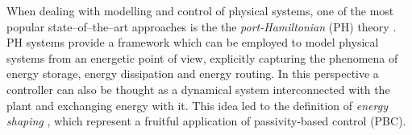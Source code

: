 {When dealing with modelling and control of physical systems, one of the most popular state--of--the--art approaches is the the \textit{port-Hamiltonian} (PH) theory \cite{secchi2007control,van2014port}. PH systems provide a framework which can be employed to model physical systems from an energetic point of view, explicitly capturing the phenomena of energy storage, energy dissipation and energy routing. 
In this perspective a controller can also be thought as a dynamical system interconnected with the plant and exchanging energy with it. 
This idea led to the definition of \textit{energy shaping} \cite{ortega2001putting}, which represent a fruitful application of passivity-based control (PBC).


}
